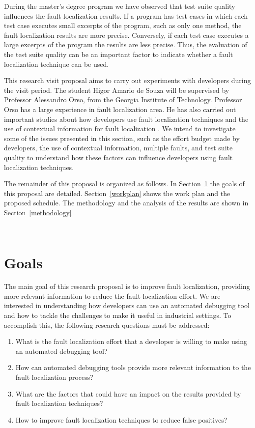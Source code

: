 \documentclass[12pt,a4paper,espaco=umemeio,noindentfirst,oneside,openany,tocpage=plain,pnumromarab,ruledheader,time,anapcustomindent]{sty/abnt}
\begin{document}
During the master's degree program \cite{souza2012b} we have observed that test suite quality influences the fault localization results. If a program has test cases 
in which each test case executes small excerpts of the program, such as only one method, the fault localization results are more precise. Conversely, if 
each test case executes a large excerpts of the program the results are less precise. Thus, the evaluation of the test suite quality can be an important 
factor to indicate whether a fault localization technique can be used. 

This research visit proposal aims to carry out experiments with developers during the visit period. The student Higor Amario de Souza will 
be supervised by Professor Alessandro Orso, from the Georgia Institute of Technology. Professor Orso has a large experience in fault localization 
area. He has also carried out important studies about how developers use fault localization techniques \cite{parnin2011} and the use of contextual information 
for fault localization \cite{hsu2008}. We intend to investigate some of the issues presented in this section, such as the effort budget made by 
developers, the use of contextual information, multiple faults, and test suite quality to understand how these factors can influence developers using 
fault localization techniques.

The remainder of this proposal is organized as follows. In Section~\ref{goals} the goals of this proposal are detailed.
Section~\ref{workplan} shows the work plan and the proposed schedule. The methodology and the analysis of the results are shown in 
Section~\ref{methodology}

\
\section{Goals}
\label{goals}

The main goal of this research proposal is to improve fault localization, providing more relevant information to reduce the fault localization effort. 
We are interested in understanding how developers can use an automated debugging tool and how to tackle the challenges to make it useful 
in industrial settings. To accomplish this, the following research questions must be addressed:

\begin{enumerate}
 \item What is the fault localization effort that a developer is willing to make using an automated debugging tool?
 \item How can automated debugging tools provide more relevant information to the fault localization process?
 \item What are the factors that could have an impact on the results provided by fault localization techniques?
 \item How to improve fault localization techniques to reduce false positives?
\end{enumerate}
\end{document}
